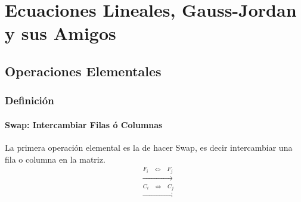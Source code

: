 \documentclass[12pt, fleqn]{report}                             %
\DeclareMathOperator \Space {\quad}                             %
\DeclareMathOperator \MiniSpace {\;}                            %
\theoremstyle{break}                                            %
\newcommand \lEqual  {\MiniSpace \Leftrightarrow \MiniSpace}    %
\newcommand \lLongTo {\longrightarrow}                          %
\begin{document}
\part{Ecuaciones Lineales, Gauss-Jordan y sus Amigos}
\clearpage



    \clearpage
    \chapter{Operaciones Elementales}


        \clearpage
        \section{Definición}


            \subsection{Swap: Intercambiar Filas ó Columnas}

                La primera operación elemental es la de hacer Swap, es decir intercambiar una
                fila o columna en la matriz.
                \begin{align*}
                    &\overset{F_i \lEqual F_j}{\lLongTo}     \\
                    &\overset{C_i \lEqual C_j}{\lLongTo}
                \end{align*}
\end{document}
